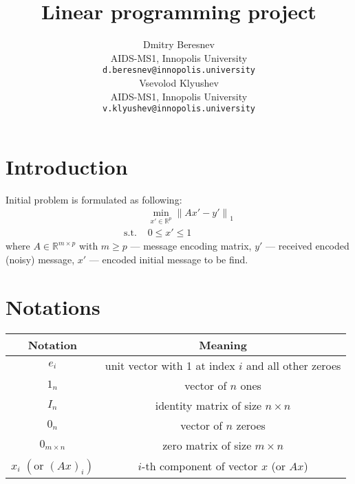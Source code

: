 \documentclass{article}
\title{Linear programming project}
\date{} 					%
\author{
  \hspace{1mm}Dmitry Beresnev \\
	AIDS-MS1, Innopolis University\\
	\texttt{d.beresnev@innopolis.university} \\
	\And{}
  \hspace{1mm}Vsevolod Klyushev \\
	AIDS-MS1, Innopolis University\\
	\texttt{v.klyushev@innopolis.university}
}
\def\R{\mathbb{R}}
\begin{document}
\maketitle


\section{Introduction}
Initial problem is formulated as following:
\begin{equation}\label{eq:init}
  \begin{aligned}
                 & \min\limits_{x' \in \R^p} {\| Ax'-y' \|}_1 \\
    \text{s.t. } & 0 \leq x' \leq 1
  \end{aligned}
\end{equation}
where $A \in \R^{m \times p}$ with $m \geq p$ --- message  encoding matrix,
$y'$ --- received encoded (noisy) message,
$x'$ --- encoded initial message to be find.

\section{Notations}

 {
  \renewcommand{\arraystretch}{1.5}
  \renewcommand{\tabcolsep}{10pt}
  \begin{table}[h]
    \centering
    \begin{tabular}{cc}
      \toprule
      \textbf{Notation}                          & \textbf{Meaning}                                     \\
      \midrule
      $e_i$                                      & unit vector with 1 at index $i$ and all other zeroes \\
      $1_n$                                      & vector of $n$ ones                                   \\
      $I_n$                                      & identity matrix of size $n \times n$                 \\
      $0_n$                                      & vector of $n$ zeroes                                 \\
      $0_{m \times n}$                           & zero matrix of size $m \times n$                     \\
      $x_i$ $\left( \text{or } {(Ax)}_i \right)$ & $i$-th component of vector $x$    (or $Ax$)          \\

      \bottomrule
    \end{tabular}
  \end{table}
 }
\end{document}
